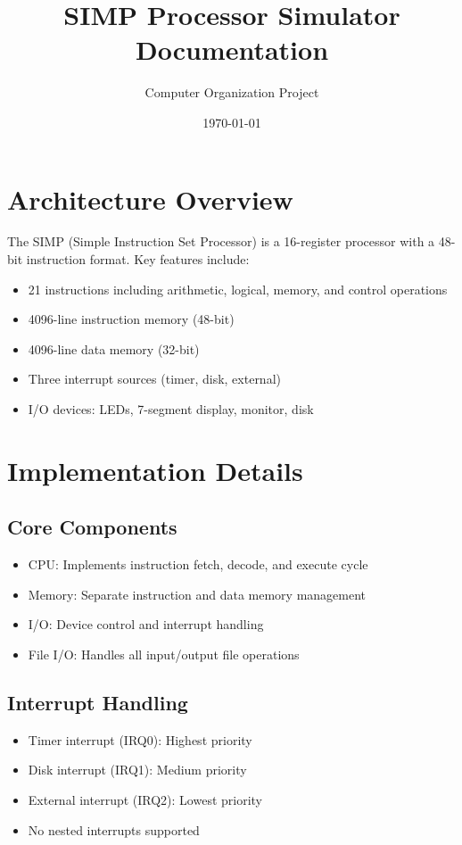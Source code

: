 \documentclass{article}
\title{SIMP Processor Simulator Documentation}
\author{Computer Organization Project}
\date{\today}
\begin{document}
\maketitle

\section{Architecture Overview}
The SIMP (Simple Instruction Set Processor) is a 16-register processor with a 48-bit instruction format. Key features include:
\begin{itemize}
    \item 21 instructions including arithmetic, logical, memory, and control operations
    \item 4096-line instruction memory (48-bit)
    \item 4096-line data memory (32-bit)
    \item Three interrupt sources (timer, disk, external)
    \item I/O devices: LEDs, 7-segment display, monitor, disk
\end{itemize}

\section{Implementation Details}
\subsection{Core Components}
\begin{itemize}
    \item CPU: Implements instruction fetch, decode, and execute cycle
    \item Memory: Separate instruction and data memory management
    \item I/O: Device control and interrupt handling
    \item File I/O: Handles all input/output file operations
\end{itemize}

\subsection{Interrupt Handling}
\begin{itemize}
    \item Timer interrupt (IRQ0): Highest priority
    \item Disk interrupt (IRQ1): Medium priority
    \item External interrupt (IRQ2): Lowest priority
    \item No nested interrupts supported
\end{itemize}
\end{document}
